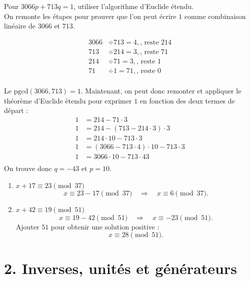 \begin{solution}
    Pour \( 3066p + 713q = 1 \), utiliser l’algorithme d’Euclide étendu. \\
    On remonte les étapes pour prouver que l'on peut écrire \( 1 \) comme combinaison linéaire de \( 3066 \) et \( 713 \).
    
    \[
    \begin{aligned}
        3066 &\div 713 = 4, \text{, reste 214} \\
        713 &\div 214 = 3, \text{, reste 71} \\
        214 &\div 71 = 3, \text{, reste 1} \\
        71 &\div 1 = 71, \text{, reste 0} \\
    \end{aligned}
    \]

    Le \( \text{pgcd}(3066, 713) = 1\). Maintenant, on peut donc remonter et appliquer le théorème d'Euclide étendu pour exprimer $1$ en fonction des deux termes de départ :\\
    \[ 
    \begin{aligned}
        1 &= 214 - 71 \cdot 3 \\
        1 &= 214 - (713 - 214 \cdot 3) \cdot 3 \\
        1 &= 214 \cdot 10 - 713 \cdot 3 \\
        1 &= (3066 - 713 \cdot 4) \cdot 10 - 713 \cdot 3 \\
        1 &= 3066 \cdot 10 - 713 \cdot 43 \\
    \end{aligned}
    \]
    On trouve donc \(q = -43\) et \(p = 10\).
\end{solution}

\begin{solution}
    \text{ }
    \begin{enumerate}[label=(\alph*)]
        \item \( x + 17 \equiv 23 \pmod{37} \)
        \[
        x \equiv 23 - 17 \pmod{37} \quad \Rightarrow \quad x \equiv 6 \pmod{37}.
        \]
        \item \( x + 42 \equiv 19 \pmod{51} \)
        \[
        x \equiv 19 - 42 \pmod{51} \quad \Rightarrow \quad x \equiv -23 \pmod{51}.
        \]
        Ajouter \( 51 \) pour obtenir une solution positive :
        \[
        x \equiv 28 \pmod{51}.
        \]
    \end{enumerate}
\end{solution}

\section*{2. Inverses, unités et générateurs}

